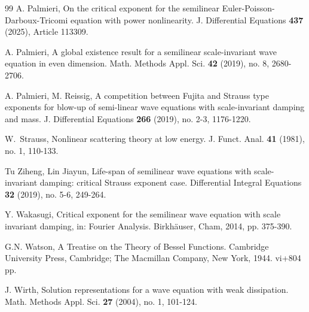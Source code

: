 \documentclass[11pt,twoside]{article}
\theoremstyle{plain}
\theoremstyle{definition}
\theoremstyle{remark}
\numberwithin{equation}{section}
\begin{document}
\begin{thebibliography}{99}
 A. Palmieri,
On the critical exponent for the semilinear Euler-Poisson-Darboux-Tricomi equation with power nonlinearity.
J. Differential Equations \textbf{437} (2025), Article 113309.

A. Palmieri, A global existence result for a semilinear scale-invariant wave equation in even dimension.
 Math. Methods Appl. Sci. \textbf{42} (2019), no. 8, 2680-2706.

A. Palmieri, M. Reissig, A competition between Fujita and Strauss type exponents for blow-up of semi-linear wave
equations with scale-invariant damping and mass. J. Differential Equations \textbf{266} (2019),  no. 2-3, 1176-1220.

 W.~Strauss, Nonlinear scattering theory at
low energy. J. Funct. Anal. \textbf{41} (1981),  no. 1, 110-133.




 Tu Ziheng, Lin Jiayun, Life-span of semilinear wave equations with scale-invariant damping: critical Strauss exponent case.
Differential Integral Equations \textbf{32} (2019), no. 5-6, 249-264.


Y. Wakasugi, Critical exponent for the semilinear wave equation with scale invariant damping, in: Fourier Analysis.
Birkh\"auser, Cham, 2014, pp. 375-390.

G.N. Watson,  A Treatise on the Theory of Bessel Functions. Cambridge University Press, Cambridge;
The Macmillan Company, New York, 1944. vi+804 pp.


J. Wirth, Solution representations for a wave equation
with weak dissipation. Math. Methods Appl. Sci. \textbf{27} (2004), no. 1, 101-124.


\end{thebibliography}




\end{document}
